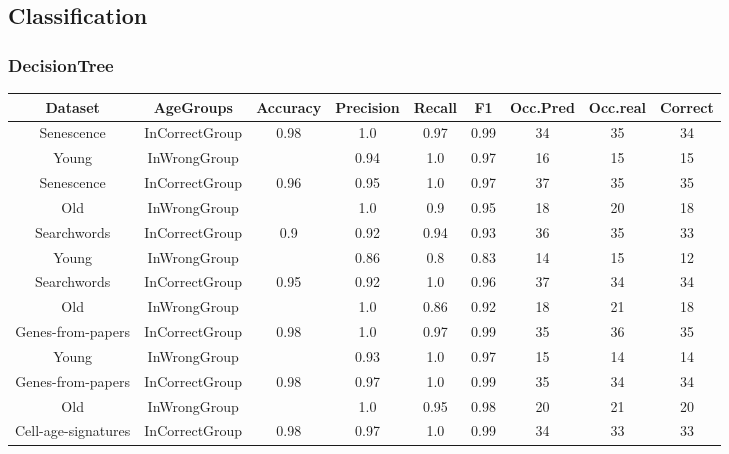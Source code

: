 \subsection*{Classification}
\subsubsection*{DecisionTree}
\begin{table}[H]
	\centering
	\small
	\begin{tabular}{|c|c|c|c|c|c|c|c|c|}
		\hline
		\textbf{Dataset} & \textbf{AgeGroups} & \textbf{Accuracy} & \textbf{Precision} & \textbf{Recall} & \textbf{F1} & \textbf{Occ.Pred} & \textbf{Occ.real} & \textbf{Correct} \\ \hline
		\rowcolor{green!80!yellow!50}
		Senescence & InCorrectGroup & 0.98 & 1.0 & 0.97 & 0.99 & 34 & 35 & 34 \\
		\rowcolor{green!80!yellow!50}
		Young & InWrongGroup &   & 0.94 & 1.0 & 0.97 & 16 & 15 & 15 \\
		\hline
		\rowcolor{green!80!yellow!50}
		Senescence & InCorrectGroup & 0.96 & 0.95 & 1.0 & 0.97 & 37 & 35 & 35 \\
		\rowcolor{green!80!yellow!50}
		Old & InWrongGroup &   & 1.0 & 0.9 & 0.95 & 18 & 20 & 18 \\
		\hline
		\hline
		\rowcolor{green!40!yellow!40}
		Searchwords & InCorrectGroup & 0.9 & 0.92 & 0.94 & 0.93 & 36 & 35 & 33 \\
		\rowcolor{green!40!yellow!40}
		Young & InWrongGroup &   & 0.86 & 0.8 & 0.83 & 14 & 15 & 12 \\
		\hline
		\rowcolor{green!40!yellow!40}
		Searchwords & InCorrectGroup & 0.95 & 0.92 & 1.0 & 0.96 & 37 & 34 & 34 \\
		\rowcolor{green!40!yellow!40}
		Old & InWrongGroup &   & 1.0 & 0.86 & 0.92 & 18 & 21 & 18 \\
		\hline
		\hline
		\rowcolor{green!80!yellow!50}
		Genes-from-papers & InCorrectGroup & 0.98 & 1.0 & 0.97 & 0.99 & 35 & 36 & 35 \\
		\rowcolor{green!80!yellow!50}
		Young & InWrongGroup &   & 0.93 & 1.0 & 0.97 & 15 & 14 & 14 \\
		\hline
		\rowcolor{green!80!yellow!50}
		Genes-from-papers & InCorrectGroup & 0.98 & 0.97 & 1.0 & 0.99 & 35 & 34 & 34 \\
		\rowcolor{green!80!yellow!50}
		Old & InWrongGroup &   & 1.0 & 0.95 & 0.98 & 20 & 21 & 20 \\
		\hline
		\hline
		\rowcolor{green!40!yellow!40}
		Cell-age-signatures & InCorrectGroup & 0.98 & 0.97 & 1.0 & 0.99 & 34 & 33 & 33 \\

\end{tabular}
\end{table}
